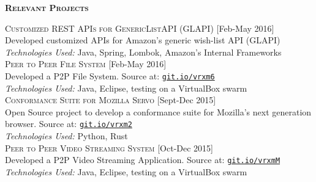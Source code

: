 \documentclass[letterpaper,12pt,final]{memoir}
\newcommand{\SmallSep}{\vspace{0.5em}}
\newcommand{\CVSection}[1]
	{\Large\textbf{\textsc{{#1}}}\par
	\SmallSep\normalsize\normalfont}
\newcommand{\CVItem}[1]
	{\textsc{\color{Plum} #1}}
\newcommand{\plumBox}[1]
{\space\space\fbox{\tiny \textbf{{#1}}}}
\newcommand{\RightAlignedInlineText}[1]
{{\footnotesize \color{Plum}  \hfill [#1]}}
\begin{document}
\CVSection{Relevant Projects}
\CVItem{Customized REST APIs for GenericListAPI (GLAPI) } \RightAlignedInlineText{Feb-May 2016}\\
{\footnotesize Developed customized APIs for Amazon's generic wish-list API (GLAPI) \\\color{Black}
	\emph{Technologies Used:} Java, Spring, Lombok, Amazon's Internal Frameworks}%
\SmallSep\\
\CVItem{Peer to Peer File System} \RightAlignedInlineText{Feb-May 2016}\\
{\footnotesize Developed a P2P File System. Source at: \color{Plum} \href{https://git.io/vrxm6}{\space\space\texttt{git.io/vrxm6}} \\\color{Black}
	\emph{Technologies Used:} Java, Eclipse, testing on a VirtualBox swarm}%
\SmallSep\\
\CVItem{Conformance Suite for Mozilla Servo} \plumBox{Open Source} \RightAlignedInlineText{Sept-Dec 2015}\\
{\footnotesize Open Source project to develop a conformance suite for Mozilla's next generation browser. Source at: \color{Plum} \href{https://git.io/vrxm2}{\space\space\texttt{git.io/vrxm2}} \\\color{Black}
	\emph{Technologies Used:} Python, Rust}%
\SmallSep\\
\CVItem{Peer to Peer Video Streaming System} \RightAlignedInlineText{Oct-Dec 2015}\\
{\footnotesize Developed a P2P Video Streaming Application. Source at: \color{Plum} \href{https://git.io/vrxmM}{\space\space\texttt{git.io/vrxmM}} \\\color{Black}
	\emph{Technologies Used:} Java, Eclipse, testing on a VirtualBox swarm}%
\SmallSep\\
\end{document}
